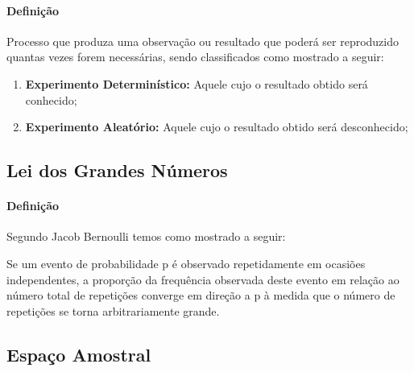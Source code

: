 \documentclass{article}
\begin{document}
            \paragraph{Definição}Processo que produza uma observação ou resultado que poderá ser reproduzido quantas vezes forem necessárias, sendo classificados como mostrado a seguir:
                \begin{enumerate}[noitemsep]
                    \item \textbf{Experimento Determinístico:} Aquele cujo o resultado obtido será conhecido;
                    \item \textbf{Experimento Aleatório:} Aquele cujo o resultado obtido será desconhecido;
                \end{enumerate}

        \subsection{Lei dos Grandes Números}
            \paragraph{Definição}Segundo Jacob Bernoulli temos como mostrado a seguir:
                \begin{displayquote}[][]
                    Se um evento de probabilidade p é observado repetidamente em ocasiões independentes, a proporção da frequência observada deste evento em relação ao número total de repetições converge em direção a p à medida que o número de repetições se torna arbitrariamente grande.
                \end{displayquote}

        \subsection{Espaço Amostral}
\end{document}
